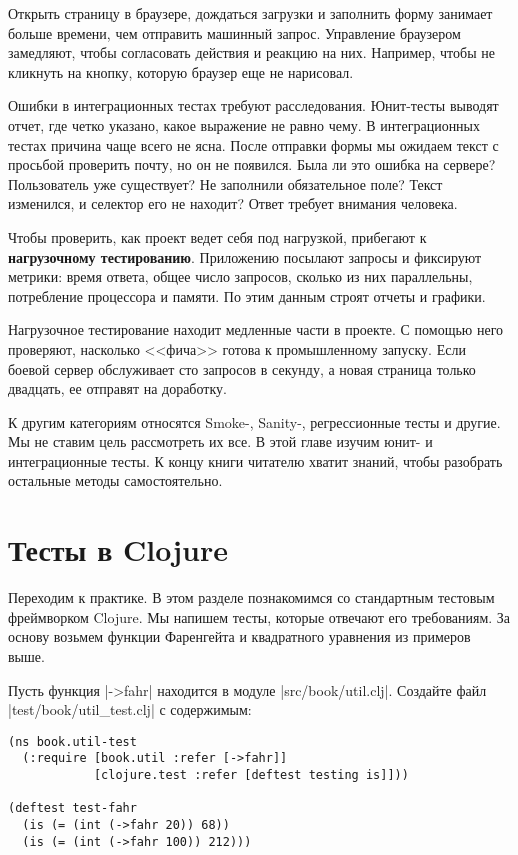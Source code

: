 Открыть страницу в браузере, дождаться загрузки и заполнить форму занимает
больше времени, чем отправить машинный запрос. Управление браузером замедляют,
чтобы согласовать действия и реакцию на них. Например, чтобы не кликнуть на
кнопку, которую браузер еще не нарисовал.

Ошибки в интеграционных тестах требуют расследования. Юнит-тесты выводят отчет,
где четко указано, какое выражение не равно чему. В интеграционных тестах
причина чаще всего не ясна. После отправки формы мы ожидаем текст с просьбой
проверить почту, но он не появился. Была ли это ошибка на сервере? Пользователь
уже существует? Не заполнили обязательное поле? Текст изменился, и селектор его
не находит? Ответ требует внимания человека.

Чтобы проверить, как проект ведет себя под нагрузкой, прибегают к
\textbf{нагрузочному тестированию}. Приложению посылают запросы и фиксируют
метрики: время ответа, общее число запросов, сколько из них параллельны,
потребление процессора и памяти. По этим данным строят отчеты и графики.

Нагрузочное тестирование находит медленные части в проекте. С помощью него
проверяют, насколько <<фича>> готова к промышленному запуску. Если боевой сервер
обслуживает сто запросов в секунду, а новая страница только двадцать, ее
отправят на доработку.

К другим категориям относятся Smoke-, Sanity-, регрессионные тесты и другие. Мы
не ставим цель рассмотреть их все. В этой главе изучим юнит- и интеграционные
тесты. К концу книги читателю хватит знаний, чтобы разобрать остальные методы
самостоятельно.

\section{Тесты в Clojure}

Переходим к практике. В этом разделе познакомимся со стандартным тестовым
фреймворком Clojure. Мы напишем тесты, которые отвечают его требованиям. За
основу возьмем функции Фаренгейта и квадратного уравнения из примеров выше.

Пусть функция \spverb|->fahr| находится в модуле
\spverb|src/book/util.clj|. Создайте файл \spverb|test/book/util_test.clj| с
содержимым:

\begin{verbatim}
(ns book.util-test
  (:require [book.util :refer [->fahr]]
            [clojure.test :refer [deftest testing is]]))

(deftest test-fahr
  (is (= (int (->fahr 20)) 68))
  (is (= (int (->fahr 100)) 212)))
\end{verbatim}

